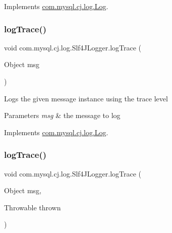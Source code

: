 Implements \mbox{\hyperlink{interfacecom_1_1mysql_1_1cj_1_1log_1_1_log_abad2a5a44ff04b24bf46a58997e4f7da}{com.\+mysql.\+cj.\+log.\+Log}}.

\mbox{\label{classcom_1_1mysql_1_1cj_1_1log_1_1_slf4_j_logger_aa2d6ea6567c9c148b7170d771686386b}} 
\subsubsection{\texorpdfstring{log\+Trace()}{logTrace()}\hspace{0.1cm}{\footnotesize\ttfamily [1/2]}}
{\footnotesize\ttfamily void com.\+mysql.\+cj.\+log.\+Slf4\+J\+Logger.\+log\+Trace (\begin{DoxyParamCaption}\item[{Object}]{msg }\end{DoxyParamCaption})}

Logs the given message instance using the \textquotesingle{}trace\textquotesingle{} level


\begin{DoxyParams}{Parameters}
{\em msg} & the message to log \\
\hline
\end{DoxyParams}


Implements \mbox{\hyperlink{interfacecom_1_1mysql_1_1cj_1_1log_1_1_log_a04f51d4b9464df28c94695ae8159440e}{com.\+mysql.\+cj.\+log.\+Log}}.

\mbox{\label{classcom_1_1mysql_1_1cj_1_1log_1_1_slf4_j_logger_aa93d48c2e1172db2949b2ac64e58052a}} 
\subsubsection{\texorpdfstring{log\+Trace()}{logTrace()}\hspace{0.1cm}{\footnotesize\ttfamily [2/2]}}
{\footnotesize\ttfamily void com.\+mysql.\+cj.\+log.\+Slf4\+J\+Logger.\+log\+Trace (\begin{DoxyParamCaption}\item[{Object}]{msg,  }\item[{Throwable}]{thrown }\end{DoxyParamCaption})}


